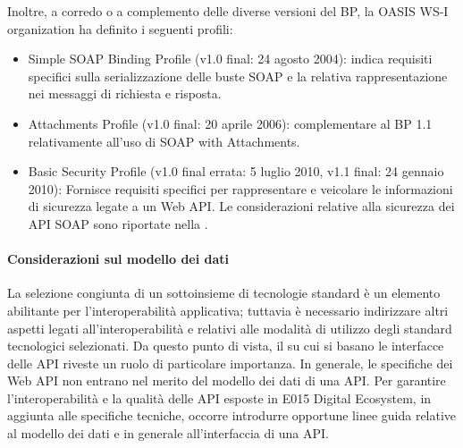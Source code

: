 \documentclass[letterpaper,10pt,italian]{sphinxmanual}
\begin{document}
Inoltre, a corredo o a complemento delle diverse versioni del BP, la OASIS WS-I organization ha definito i seguenti profili:
\begin{itemize}
\item {} 
Simple SOAP Binding Profile (v1.0 final: 24 agosto 2004): indica requisiti specifici sulla serializzazione delle buste SOAP e la relativa rappresentazione nei messaggi di richiesta e risposta.

\item {} 
Attachments Profile (v1.0 final: 20 aprile 2006): complementare al BP 1.1 relativamente all’uso di SOAP with Attachments.

\item {} 
Basic Security Profile (v1.0 final errata: 5 luglio 2010, v1.1 final: 24 gennaio 2010): Fornisce requisiti specifici per rappresentare e veicolare le informazioni di sicurezza legate a un Web API. Le considerazioni relative alla sicurezza dei API SOAP sono riportate nella {\hyperref[\detokenize{sez22:sezione2241}]{}}.

\end{itemize}


\paragraph{Considerazioni sul modello dei dati}
\label{\detokenize{sez21:considerazioni-sul-modello-dei-dati}}
La selezione congiunta di un sottoinsieme di tecnologie standard è un elemento abilitante per l’interoperabilità applicativa; tuttavia è necessario indirizzare altri aspetti legati all’interoperabilità e relativi alle modalità di utilizzo degli standard tecnologici selezionati.
Da questo punto di vista, il  su cui si basano le interfacce delle API riveste un ruolo di particolare importanza. In generale, le specifiche dei Web API non entrano nel merito del modello dei dati di una API. Per garantire l’interoperabilità e la qualità delle API esposte in E015 Digital Ecosystem, in aggiunta alle specifiche tecniche, occorre introdurre opportune linee guida relative al modello dei dati e in generale all’interfaccia di una API.
\end{document}
